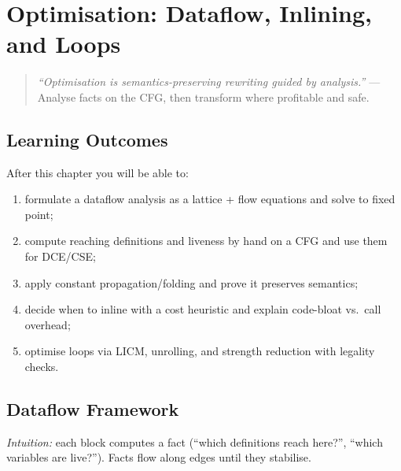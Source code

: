 \chapter{Optimisation: Dataflow, Inlining, and Loops}
\label{ch:optimisation}

\begin{quote}
\emph{``Optimisation is semantics-preserving rewriting guided by analysis.''} --- Analyse facts on the CFG, then transform where profitable and safe.
\end{quote}

\noindent{}
\vspace{0.4em}

\section*{Learning Outcomes}
After this chapter you will be able to:
\begin{enumerate}[label=(L\arabic*)]
    \item formulate a dataflow analysis as a lattice + flow equations and solve to fixed point;
    \item compute reaching definitions and liveness by hand on a CFG and use them for DCE/CSE;
    \item apply constant propagation/folding and prove it preserves semantics;
    \item decide when to inline with a cost heuristic and explain code-bloat vs.\ call overhead;
    \item optimise loops via LICM, unrolling, and strength reduction with legality checks.
\end{enumerate}

\section{Dataflow Framework}
\label{sec:dataflow}
\emph{Intuition:} each block computes a fact (``which definitions reach here?'', ``which variables are live?''). Facts flow along edges until they stabilise.


